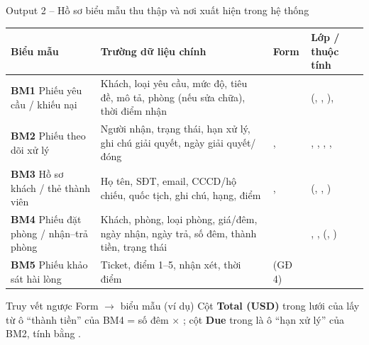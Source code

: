 \begin{frame}{Output 2 -- Hồ sơ biểu mẫu thu thập và nơi xuất hiện trong hệ thống}
\scriptsize
\begin{tabularx}{\textwidth}{@{}L{2.55cm}YL{2.55cm}L{3.1cm}@{}}
\toprule
\textbf{Biểu mẫu} & \textbf{Trường dữ liệu chính} & \textbf{Form} & \textbf{Lớp / thuộc tính} \\
\midrule
\textcolor{tvA}{\textbf{BM1}} Phiếu yêu cầu / khiếu nại & Khách, loại yêu cầu, mức độ, tiêu đề, mô tả, phòng (nếu sửa chữa), thời điểm nhận &  &  (, , ),  \\
\textcolor{tvA}{\textbf{BM2}} Phiếu theo dõi xử lý & Người nhận, trạng thái, hạn xử lý, ghi chú giải quyết, ngày giải quyết/đóng & ,  & , , , ,  \\
\textcolor{tvB}{\textbf{BM3}} Hồ sơ khách / thẻ thành viên & Họ tên, SĐT, email, CCCD/hộ chiếu, quốc tịch, ghi chú, hạng, điểm & ,  &  (, , ) \\
\textcolor{tvB}{\textbf{BM4}} Phiếu đặt phòng / nhận--trả phòng & Khách, phòng, loại phòng, giá/đêm, ngày nhận, ngày trả, số đêm, thành tiền, trạng thái &  & , ,  (, ) \\
\textcolor{tvB}{\textbf{BM5}} Phiếu khảo sát hài lòng & Ticket, điểm 1--5, nhận xét, thời điểm &  (GĐ 4) &  \\
\bottomrule
\end{tabularx}

\vspace{2mm}
\begin{block}{Truy vết ngược Form $\to$ biểu mẫu (ví dụ)}
Cột \textbf{Total (USD)} trong lưới của  lấy từ ô ``thành tiền'' của BM4 = số đêm $\times$ ; cột \textbf{Due} trong  là ô ``hạn xử lý'' của BM2, tính bằng .
\end{block}
\end{frame}

